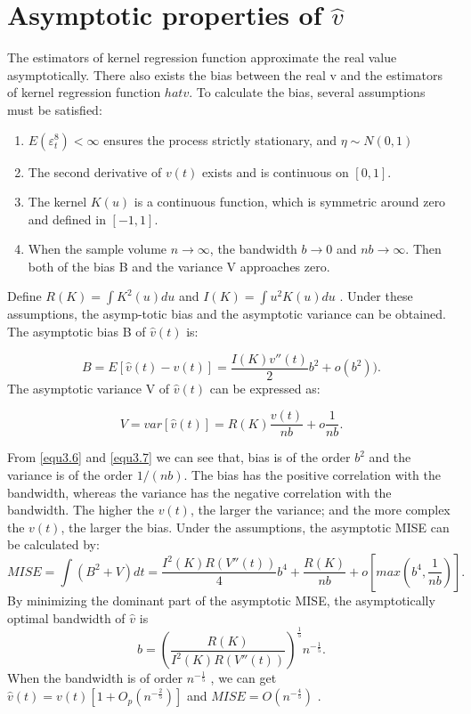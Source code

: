 \section{ Asymptotic properties of $\hat{v}$}
The estimators of kernel regression function approximate the real value asymptotically. There also exists the bias between the real v and the estimators of kernel regression function $hat{v}$.
To calculate the bias, several assumptions must be satisfied:
 \begin{enumerate}
    \item $E(\varepsilon_{t}^{8})<\infty$ ensures the process strictly stationary, and $\eta \sim N(0,1)$\cite{Ling2002}
    \item The second derivative of $v(t)$ exists and is continuous on $[0,1]$.
    \item The kernel $K(u)$ is a continuous function, which is symmetric around zero and defined in $[-1, 1]$.
    
    \item When the sample volume $n \rightarrow \infty $, the bandwidth $b \rightarrow 0 $ and $nb \rightarrow \infty $. Then both of the bias B and the variance V approaches zero.
  
\end{enumerate}
Define $R(K)= \int K^{2}(u)du$ and $I(K)=\int u^{2}K(u)du$ . Under these assumptions, the asymp-totic bias and the asymptotic variance can be obtained.
The asymptotic bias B of $\hat{v}(t)$ is:

\begin{equation}
\label{equ3.6}
B=E[\hat{v}(t)-v(t)] = \frac{I(K)v''(t)}{2}b^{2}+o(b^{2})).
\end{equation}
The asymptotic variance V of $\hat{v}(t)$ can be expressed as:

\begin{equation}
\label{equ3.7}
V=var[\hat{v}(t)]=R(K)\frac{v(t)}{nb}+o\frac{1}{nb}.
\end{equation}   

From \ref{equ3.6} and \ref{equ3.7} we can see that, bias is of the order $b^{2}$ and the variance is of the order $1/(nb)$. The bias has the positive correlation with the bandwidth, whereas the variance has the negative correlation with the bandwidth. The higher the $v(t)$, the larger the variance; and the more complex the $v(t)$, the larger the bias.
Under the assumptions, the asymptotic MISE can be calculated by:
\begin{equation}
MISE = \int(B^{2}+V)dt=\frac{I^{2}(K)R(V''(t))}{4}b^{4} + \frac{R(K)}{nb} + o[max(b^{4},\frac{1}{nb})].
\end{equation}
By minimizing the dominant part of the asymptotic MISE, the asymptotically optimal bandwidth of $\hat{v}$  is
\begin{equation}
b=(\frac{R(K)}{I^{2}(K)R(V''(t))})^{\frac{1}{5}}n^{-\frac{1}{5}}.
\end{equation}
When the bandwidth is of order $n^{-\frac{1}{5}}$  , we can get $\hat{v}(t)=v(t)[1+O_{p}(n^{-\frac{2}{5}})]$  and $MISE=O(n^{-\frac{4}{5}})$ \cite{Gasser1984} \cite{Fan1991}.

